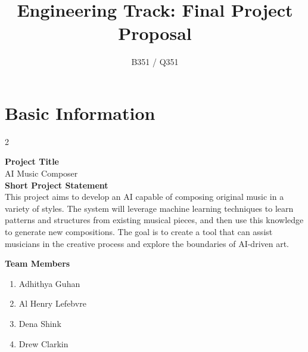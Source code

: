 \documentclass[]{article}
\title{\vspace{-2.5cm}Engineering Track: Final Project Proposal}
\author{B351 / Q351}
\date{}
\begin{document}
\maketitle

\section*{Basic Information}

\begin{multicols}{2}
	
\textbf{Project Title}\\

\vspace{0.25cm}
AI Music Composer\\

\textbf{Short Project Statement}\\
This project aims to develop an AI capable of composing original music in a variety of styles. The system will leverage machine learning techniques to learn patterns and structures from existing musical pieces, and then use this knowledge to generate new compositions. The goal is to create a tool that can assist musicians in the creative process and explore the boundaries of AI-driven art.

\columnbreak
\textbf{Team Members}
\begin{enumerate}

    \item Adhithya Guhan
    \vspace{1cm}
    \item Al Henry Lefebvre
    \vspace{1cm}
    \item Dena Shink
    \vspace{1cm}
    \item Drew Clarkin

\end{enumerate}

\end{multicols}
\end{document}

